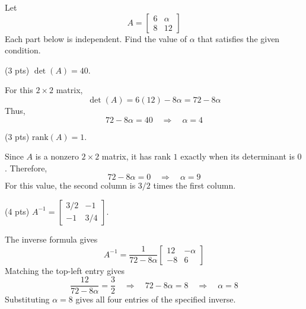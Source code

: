 \documentclass[11pt]{article}
\begin{document}
\begin{prob}[(10 pts)]
Let
\[
A=\begin{bmatrix}6&\alpha\\8&12\end{bmatrix}
\]
Each part below is independent. Find the value of $\alpha$ that satisfies the given condition.
\begin{subprob}(3 pts)
$\det(A)=40$.\par\vspace{0.2em}

\begin{solution}
For this $2\times2$ matrix,
\[
\det(A)=6(12)-8\alpha=72-8\alpha
\]
Thus,
\[
72-8\alpha=40\quad\Longrightarrow\quad\boxed{\alpha=4}
\]
\end{solution}
\end{subprob}
\begin{subprob}(3 pts)
$\text{rank}(A)=1$.\par\vspace{0.2em}

\begin{solution}
Since $A$ is a nonzero $2\times2$ matrix, it has rank $1$ exactly when its determinant is $0$. Therefore,
\[
72-8\alpha=0\quad\Longrightarrow\quad\boxed{\alpha=9}
\]
For this value, the second column is $3/2$ times the first column.
\end{solution}
\end{subprob}
\begin{subprob}(4 pts)
$A^{-1}=\begin{bmatrix}3/2&-1\\-1&3/4\end{bmatrix}$.\par\vspace{0.2em}

\begin{solution}
The inverse formula gives
\[
A^{-1}=\frac{1}{72-8\alpha}\begin{bmatrix}12&-\alpha\\-8&6\end{bmatrix}
\]
Matching the top-left entry gives
\[
\frac{12}{72-8\alpha}=\frac32
\quad\Longrightarrow\quad72-8\alpha=8
\quad\Longrightarrow\quad\boxed{\alpha=8}
\]
Substituting $\alpha=8$ gives all four entries of the specified inverse.
\end{solution}
\end{subprob}
\end{prob}
\newpage
\end{document}
